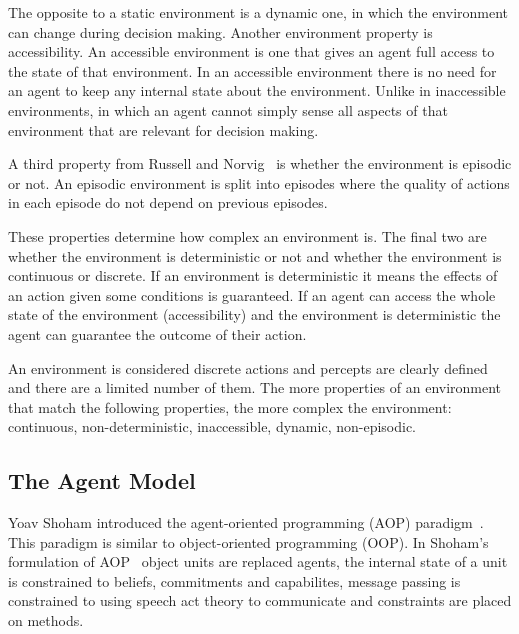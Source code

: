 \documentclass[]{final_report}
\begin{document}
The opposite to a static environment is a dynamic one, in which the environment can change during decision making. Another environment property is accessibility. An accessible environment is one that gives an agent full access to the state of that environment. In an accessible environment there is no need for an agent to keep any internal state about the environment. Unlike in inaccessible environments, in which an agent cannot simply sense all aspects of that environment that are relevant for decision making.\par 
A third property from Russell and Norvig~\cite{russell2016artificial} is whether the environment is episodic or not. An episodic environment is split into episodes where the quality of actions in each episode do not depend on previous episodes.\par 
These properties determine how complex an environment is. The final two are whether the environment is deterministic or not and whether the environment is continuous or discrete. If an environment is deterministic it means the effects of an action given some conditions is guaranteed. If an agent can access the whole state of the environment (accessibility) and the environment is deterministic the agent can guarantee the outcome of their action.\par 
An environment is considered discrete actions and percepts are clearly defined and there are a limited number of them. The more properties of an environment that match the following properties, the more complex the environment: continuous, non-deterministic, inaccessible, dynamic, non-episodic.\par 

\subsection{The Agent Model}
Yoav Shoham introduced the agent-oriented programming (AOP) paradigm~\cite{shoham1993agent}. This paradigm is similar to object-oriented programming (OOP). In Shoham's formulation of AOP~\cite{shoham1991agent0} object units are replaced agents, the internal state of a unit is constrained to beliefs, commitments and capabilites, message passing is constrained to using speech act theory to communicate and constraints are placed on methods.
\end{document}
